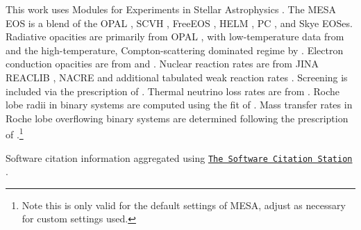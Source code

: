 \documentclass[linenumbers,trackchanges,twocolumn]{aastex701}
\begin{document}
This work uses Modules for Experiments in Stellar Astrophysics \citep[MESA][]{Paxton2011, Paxton2013, Paxton2015, Paxton2018, Paxton2019, Jermyn2023}. The MESA EOS is a blend of the OPAL \citep{Rogers2002}, SCVH \citep{Saumon1995}, FreeEOS \citep{Irwin2004}, HELM \citep{Timmes2000}, PC \citep{Potekhin2010}, and Skye \citep{Jermyn2021} EOSes. Radiative opacities are primarily from OPAL \citep{Iglesias1993, Iglesias1996}, with low-temperature data from \citet{Ferguson2005} and the high-temperature, Compton-scattering dominated regime by \citet{Poutanen2017}. Electron conduction opacities are from \citet{Cassisi2007} and \citet{Blouin2020}. Nuclear reaction rates are from JINA REACLIB \citep{Cyburt2010}, NACRE \citep{Angulo1999} and additional tabulated weak reaction rates \citet{Fuller1985, Oda1994, Langanke2000}. Screening is included via the prescription of \citet{Chugunov2007}. Thermal neutrino loss rates are from \citet{Itoh1996}. Roche lobe radii in binary systems are computed using the fit of \citet{Eggleton1983}. Mass transfer rates in Roche lobe overflowing binary systems are determined following the prescription of \citet{Ritter1988}.\footnote{Note this is only valid for the default settings of MESA, adjust as necessary for custom settings used.}

Software citation information aggregated using \texttt{\href{https://www.tomwagg.com/software-citation-station/}{The Software Citation Station}} \citep{software-citation-station-paper, software-citation-station-zenodo}.



\appendix


{}



\end{document}
